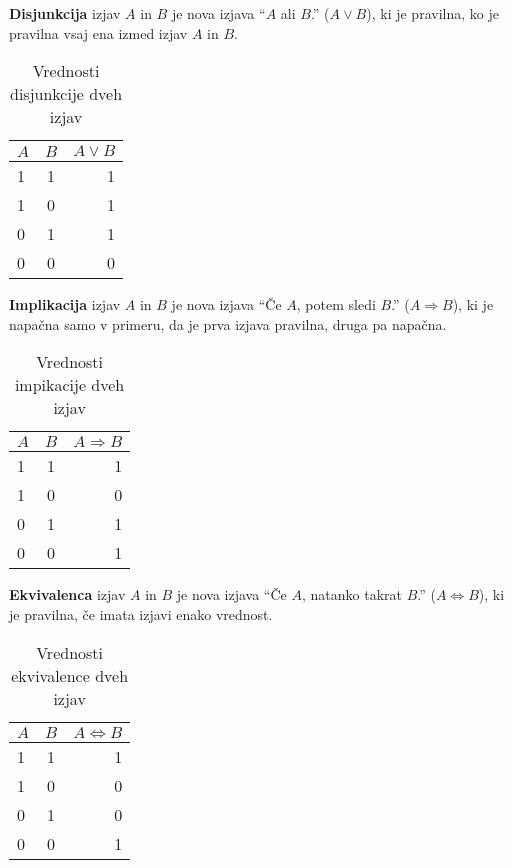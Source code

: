\documentclass[a4paper,oneside,12pt,fleqn]{article}
\renewcommand\implies\Rightarrow
\renewcommand\iff\Leftrightarrow
\numberwithin{equation}{section}
\begin{document}
\textbf{Disjunkcija} izjav $A$ in $B$ je nova izjava ``$A$ ali $B$.'' ($A \lor B$),
ki je pravilna, ko je pravilna vsaj ena izmed izjav $A$ in $B$.
\begin{table}[h]
  \centering
  \label{tab:izjave:disj}
  \begin{tabular}{ | l | c | r |}
    \hline
    $A$ & $B$ & $A \lor B$\\
    \hline
    1 & 1 & 1\\
    \hline
    1 & 0 & 1\\
    \hline
    0 & 1 & 1\\
    \hline
    0 & 0 & 0\\
    \hline
  \end{tabular}
  \caption{Vrednosti disjunkcije dveh izjav}
\end{table}

\textbf{Implikacija} izjav $A$ in $B$ je nova izjava ``Če $A$, potem sledi $B$.'' ($A
\implies B$), ki je napačna samo v primeru, da je prva izjava pravilna, druga pa napačna.
\begin{table}[h]
  \centering
  \label{tab:izjave:imp}
  \begin{tabular}{ | l | c | r |}
    \hline
    $A$ & $B$ & $A \implies B$\\
    \hline
    1 & 1 & 1\\
    \hline
    1 & 0 & 0\\
    \hline
    0 & 1 & 1\\
    \hline
    0 & 0 & 1\\
    \hline
  \end{tabular}
  \caption{Vrednosti impikacije dveh izjav}
\end{table}

\textbf{Ekvivalenca} izjav $A$ in $B$ je nova izjava ``Če $A$, natanko takrat $B$.'' ($A
\iff B$), ki je pravilna, če imata izjavi enako vrednost.
\begin{table}[h]
  \centering
  \label{tab:izjave:ekv}
  \begin{tabular}{ | l | c | r |}
    \hline
    $A$ & $B$ & $A \iff B$\\
    \hline
    1 & 1 & 1\\
    \hline
    1 & 0 & 0\\
    \hline
    0 & 1 & 0\\
    \hline
    0 & 0 & 1\\
    \hline
  \end{tabular}
  \caption{Vrednosti ekvivalence dveh izjav}
\end{table}
\end{document}
